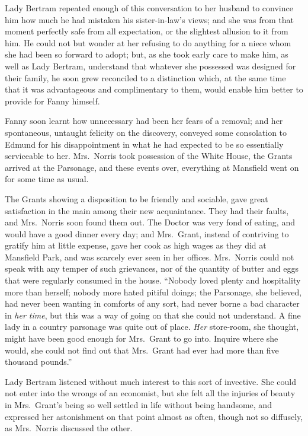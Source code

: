Lady Bertram repeated enough of this conversation
to her husband to convince him how much he had mistaken
his sister-in-law's views; and she was from that moment
perfectly safe from all expectation, or the slightest
allusion to it from him.  He could not but wonder at her
refusing to do anything for a niece whom she had been so
forward to adopt; but, as she took early care to make him,
as well as Lady Bertram, understand that whatever she
possessed was designed for their family, he soon grew
reconciled to a distinction which, at the same time
that it was advantageous and complimentary to them,
would enable him better to provide for Fanny himself.

Fanny soon learnt how unnecessary had been her fears of a removal;
and her spontaneous, untaught felicity on the discovery,
conveyed some consolation to Edmund for his disappointment
in what he had expected to be so essentially serviceable
to her.  Mrs.\ Norris took possession of the White House,
the Grants arrived at the Parsonage, and these events over,
everything at Mansfield went on for some time as usual.

The Grants showing a disposition to be friendly and sociable,
gave great satisfaction in the main among their new acquaintance.
They had their faults, and Mrs.\ Norris soon found them out.
The Doctor was very fond of eating, and would have a good
dinner every day; and Mrs.\ Grant, instead of contriving
to gratify him at little expense, gave her cook as high
wages as they did at Mansfield Park, and was scarcely ever
seen in her offices.  Mrs.\ Norris could not speak with any
temper of such grievances, nor of the quantity of butter
and eggs that were regularly consumed in the house.
``Nobody loved plenty and hospitality more than herself;
nobody more hated pitiful doings; the Parsonage,
she believed, had never been wanting in comforts of any sort,
had never borne a bad character in \emph{her time}, but this
was a way of going on that she could not understand.
A fine lady in a country parsonage was quite out of place.
\emph{Her} store-room, she thought, might have been good enough
for Mrs.\ Grant to go into.  Inquire where she would,
she could not find out that Mrs.\ Grant had ever had more
than five thousand pounds.''

Lady Bertram listened without much interest to this
sort of invective.  She could not enter into the wrongs
of an economist, but she felt all the injuries of beauty
in Mrs.\ Grant's being so well settled in life without
being handsome, and expressed her astonishment on
that point almost as often, though not so diffusely,
as Mrs.\ Norris discussed the other.

